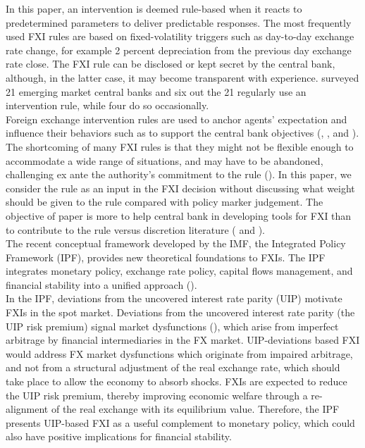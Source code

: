 \documentclass[11pt]{article}
\begin{document}
In  this  paper, an  intervention  is  deemed  rule-based  when it  reacts  to
predetermined parameters to deliver predictable responses. The most frequently
used  FXI rules  are based  on  fixed-volatility triggers  such as  day-to-day
exchange rate change, for example 2 percent depreciation from the previous day
exchange rate  close. The  FXI rule  can be  disclosed or  kept secret  by the
central bank,  although, in the  latter case,  it may become  transparent with
experience. \cite{patel2019} surveyed 21 emerging market central banks and six
out  the   21  regularly  use   an  intervention   rule,  while  four   do  so
occasionally.\\

Foreign exchange intervention rules are used to anchor agents’ expectation and
influence  their behaviors  such as  to  support the  central bank  objectives
(\cite{krugman1991},   \cite{montoro2013},   and   \cite{fanelli2020}).    The
shortcoming of  many FXI rules  is that they might  not be flexible  enough to
accommodate  a  wide range  of  situations,  and  may  have to  be  abandoned,
challenging    ex   ante    the   authority’s    commitment   to    the   rule
(\cite{kydland1977}).  In this paper, we consider  the rule as an input in the
FXI  decision without  discussing  what weight  should be  given  to the  rule
compared with policy marker judgement. The  objective of paper is more to help
central bank in developing tools for FXI than to contribute to the rule versus
discretion literature (\cite{barro1983} and \cite{taylor2017}).\\

The recent  conceptual framework developed  by the IMF, the  Integrated Policy
Framework  (IPF),  provides new  theoretical  foundations  to FXIs.   The  IPF
integrates monetary  policy, exchange  rate policy, capital  flows management,
and financial stability into a unified approach (\cite{basu2020}).\\

In the IPF, deviations from the  uncovered interest rate parity (UIP) motivate
FXIs in  the spot market. Deviations  from the uncovered interest  rate parity
(the  UIP risk  premium)  signal market  dysfunctions (\cite{imf2020}),  which
arise  from  imperfect  arbitrage  by   financial  intermediaries  in  the  FX
market. UIP-deviations  based FXI would  address FX market  dysfunctions which
originate from impaired arbitrage, and not from a structural adjustment of the
real exchange  rate, which should  take place to  allow the economy  to absorb
shocks. FXIs  are expected to reduce  the UIP risk premium,  thereby improving
economic  welfare  through  a  re-alignment  of the  real  exchange  with  its
equilibrium  value. Therefore,  the IPF  presents  UIP-based FXI  as a  useful
complement to monetary policy, which could also have positive implications for
financial stability.\\
\end{document}
